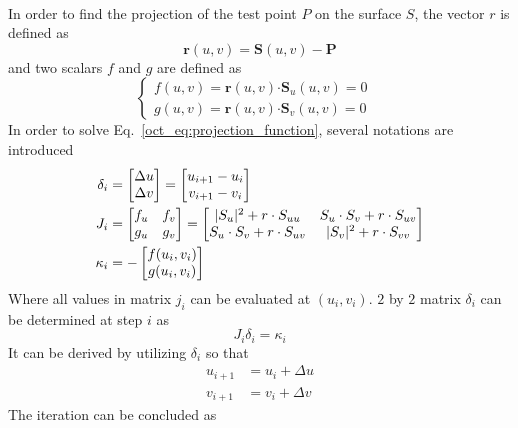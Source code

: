 \paragraph{}
In order to find the projection of the test point $P$ on the surface $S$, the vector $r$ is defined as
\begin{equation}
    \mathbf{r} (u, v) =
    \mathbf{S} (u, v) -
    \mathbf{P}
\end{equation}
%
and two scalars $f$ and $g$ are defined as
\begin{equation}
    \left\{
        \begin{array}{rl}
            f (u, v) =
            \mathbf{r}(u, v) \mathbf{\cdot} \mathbf{S}_u (u, v)
            = 0 & \\
            g (u, v) =
            \mathbf{r}(u, v) \mathbf{\cdot} \mathbf{S}_v (u, v)
            = 0 &
        \end{array}
    \right.
\label{oct_eq:projection_function}
\end{equation}
%
In order to solve Eq.~\ref{oct_eq:projection_function}, several notations are introduced
\begin{align*}
    \delta_i &=
        \begin{bmatrix}
            \Delta u \\
            \Delta v
        \end{bmatrix} = 
        \begin{bmatrix}
            u_{i+1} - u_i \\
            v_{i+1} - v_i
        \end{bmatrix} \\
    J_i &=
        \begin{bmatrix}
            f_u & f_v \\
            g_u & g_v
        \end{bmatrix} = 
        \begin{bmatrix}
            \boldmath
            |S_u|^2 + r \cdot S_{uu}        &       S_u \cdot S_v + r \cdot S_{uv} \\
            S_u \cdot S_v + r \cdot S_{uv}  &       |S_v|^2 + r \cdot S_{vv}
        \end{bmatrix} \\
    \kappa_i & = -
        \begin{bmatrix}
            f(u_i, v_i) \\
            g(u_i, v_i)
        \end{bmatrix}
\end{align*}
%
Where all values in matrix $j_i$ can be evaluated at $(u_i, v_i)$.
$2$ by $2$ matrix $\delta_i$ can be determined at step $i$ as
\begin{equation}
    J_i \delta_i = \kappa_i
\end{equation}
%
It can be derived by utilizing $\delta_i$ so that
\begin{subequations}
\begin{align}
    u_{i+1} & = u_i + \Delta u \\
    v_{i+1} & = v_i + \Delta v
\end{align}
\label{oct_eq:projection_iteration}
\end{subequations}
%
The iteration can be concluded as

